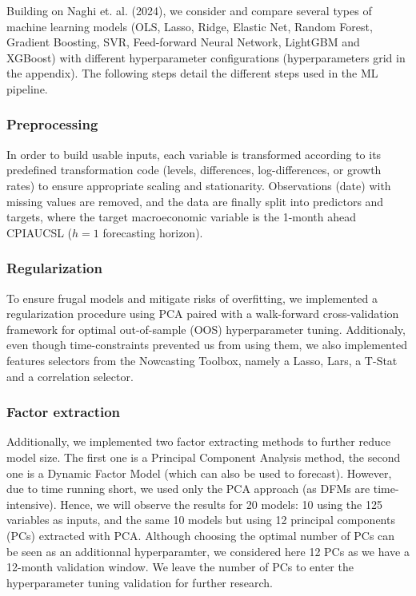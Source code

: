 \documentclass{article}
\begin{document}
Building on Naghi et. al. (2024), we consider and compare several types of machine learning models (OLS, Lasso, Ridge, Elastic Net, Random Forest, Gradient Boosting, SVR, Feed-forward Neural Network, LightGBM and XGBoost) with different hyperparameter configurations (hyperparameters grid in the appendix). The following steps detail the different steps used in the ML pipeline.

\subsubsection{Preprocessing}

In order to build usable inputs, each variable is transformed according to its predefined transformation code (levels, differences, log-differences, or growth rates) to ensure appropriate scaling and stationarity. Observations (date) with missing values are removed, and the data are finally split into predictors and targets, where the target macroeconomic variable is the 1-month ahead CPIAUCSL ($h = 1$ forecasting horizon).

\subsubsection{Regularization}

To ensure frugal models and mitigate risks of overfitting, we implemented a regularization procedure using PCA paired with a walk-forward cross-validation framework for optimal out-of-sample (OOS) hyperparameter tuning. Additionaly, even though time-constraints prevented us from using them, we also implemented features selectors from the Nowcasting Toolbox, namely a Lasso, Lars, a T-Stat and a correlation selector.


\subsubsection{Factor extraction}

Additionally, we implemented two factor extracting methods to further reduce model size. The first one is a Principal Component Analysis method, the second one is a Dynamic Factor Model (which can also be used to forecast). However, due to time running short, we used only the PCA approach (as DFMs are time-intensive). Hence, we will observe the results for 20 models: 10 using the 125 variables as inputs, and the same 10 models but using 12 principal components (PCs) extracted with PCA. Although choosing the optimal number of PCs can be seen as an additionnal hyperparamter, we considered here 12 PCs as we have a 12-month validation window. We leave the number of PCs to enter the hyperparameter tuning validation for further research.
\end{document}
